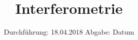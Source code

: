 

\subject{V64}
\title{Interferometrie}
\date{
  Durchführung: 18.04.2018
  \hspace{3em}
  Abgabe: Datum
}



\maketitle
\newpage





%
%


\printbibliography


